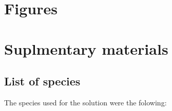 \documentclass[]{article}
\begin{document}
\hypertarget{figures}{%
\section*{Figures}\label{figures}}

\hypertarget{suplmentary-materials}{%
\section{Suplmentary materials}\label{suplmentary-materials}}

\hypertarget{list-of-species}{%
\subsection{List of species}\label{list-of-species}}

The species used for the solution were the folowing:
\end{document}
